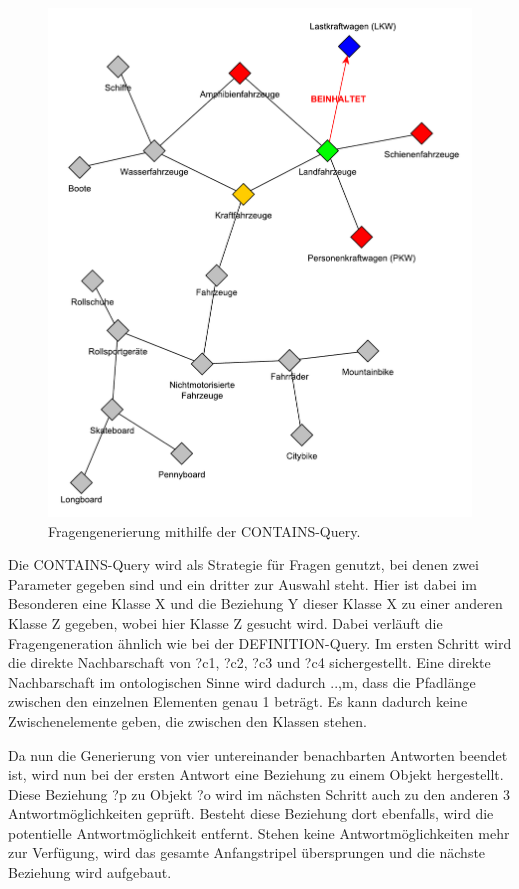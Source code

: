 \documentclass[headsepline,titlepage,ngerman,twoside,12pt]{report}
\begin{document}
\begin{figure}
\centering
\includegraphics[width=\textwidth]{images/contains.pdf}
\caption{Fragengenerierung mithilfe der CONTAINS-Query.}
\label{img:contains-query-prototype}
\end{figure}

Die CONTAINS-Query wird als Strategie für Fragen genutzt, bei denen zwei Parameter gegeben sind und ein dritter zur Auswahl steht.
Hier ist dabei im Besonderen eine Klasse X und die Beziehung Y dieser Klasse X zu einer anderen Klasse Z gegeben, wobei hier Klasse Z gesucht wird.
Dabei verläuft die Fragengeneration ähnlich wie bei der DEFINITION-Query.
Im ersten Schritt wird die direkte Nachbarschaft von ?c1, ?c2, ?c3 und ?c4 sichergestellt. 
Eine direkte Nachbarschaft im ontologischen Sinne wird dadurch  ..,m, dass die Pfadlänge zwischen den einzelnen Elementen genau 1 beträgt.
Es kann dadurch keine Zwischenelemente geben, die zwischen den Klassen stehen.

Da nun die Generierung von vier untereinander benachbarten Antworten beendet ist, wird nun bei der ersten Antwort eine Beziehung zu einem Objekt hergestellt.
Diese Beziehung ?p zu Objekt ?o wird im nächsten Schritt auch zu den anderen 3 Antwortmöglichkeiten geprüft.
Besteht diese Beziehung dort ebenfalls, wird die potentielle Antwortmöglichkeit entfernt.
Stehen keine Antwortmöglichkeiten mehr zur Verfügung, wird das gesamte Anfangstripel übersprungen und die nächste Beziehung wird aufgebaut.
\end{document}
